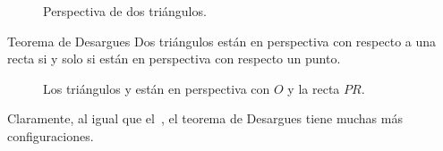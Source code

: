 \begin{figure}[H]
    \centering
    
    \caption{Perspectiva de dos triángulos.}
\end{figure}


\begin{section-theorem.tcb}{Teorema de Desargues}{}
    Dos triángulos están en perspectiva con respecto a una recta si y solo si están en perspectiva con respecto un punto.
\end{section-theorem.tcb}

\begin{figure}[H]
    \centering
    
    \caption{Los triángulos  y  están en perspectiva con $O$ y la recta $PR$.}
\end{figure}

Claramente, al igual que el~, el teorema de Desargues tiene muchas más configuraciones.

